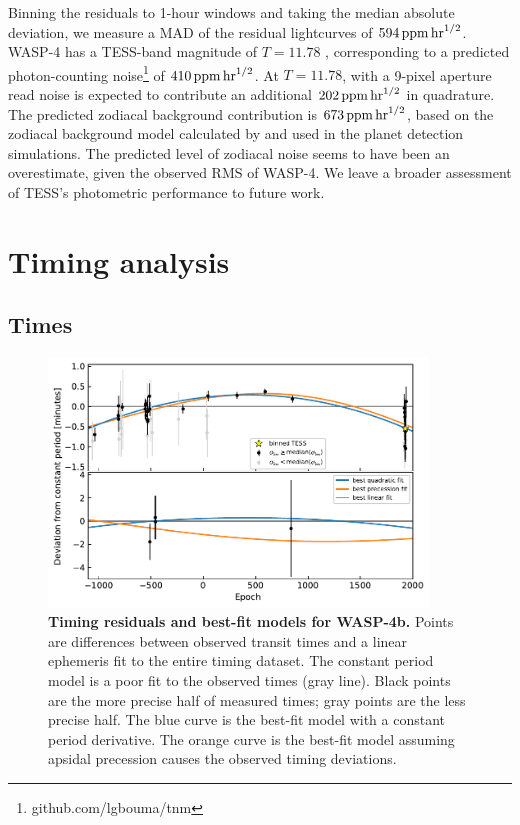\documentclass[12pt,twocolumn,tighten]{aastex62}
\begin{document}
Binning the residuals to 1-hour windows and taking the median absolute
deviation, we measure a MAD of the residual lightcurves of $594\,{\rm
ppm}\,{\rm hr}^{1/2}$.  WASP-4 has a TESS-band magnitude of $T=11.78$
\citep{stassun_TIC_2018}, corresponding to a predicted photon-counting
noise\footnote{github.com/lgbouma/tnm} of $410\,{\rm ppm}\,{\rm
hr}^{1/2}$.  At $T=11.78$, with a 9-pixel aperture read noise is
expected to contribute an additional $202\,{\rm ppm}\,{\rm hr}^{1/2}$
in quadrature.  The predicted zodiacal background contribution is
$673\,{\rm ppm}\,{\rm hr}^{1/2}$, based on the zodiacal background
model calculated by \citet{winn_photonflux_2013} and used in the
\citet{Sullivan_2015} planet detection simulations.  The predicted
level of zodiacal noise seems to have been an overestimate, given the
observed RMS of WASP-4.  We leave a broader assessment of TESS's
photometric performance to future work.

\section{Timing analysis}
\label{sec:timing}

\subsection{Times}
\label{subsec:times}


\begin{figure}[t]
    \begin{center}
        \leavevmode
        \includegraphics[width=0.9\textwidth]{f3.pdf}
    \end{center}
    \vspace{-0.5cm}
    \caption{
        {\bf Timing residuals and best-fit models for WASP-4b.}
        Points are differences between observed transit times and a linear
        ephemeris fit to the entire timing dataset.
        The constant period model is a poor fit to the observed times
        (gray line).
        Black points are the more precise half of measured times; gray
        points are the less precise half.
        The blue curve is the best-fit model with a constant period
        derivative.
        The orange curve is the best-fit model assuming apsidal precession
        causes the observed timing deviations.
        \label{fig:times}
    }
\end{figure}
\end{document}
